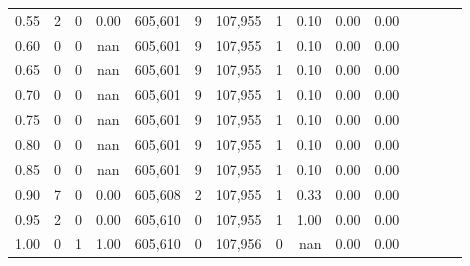 \begin{tabular}{rrrcrrrrrrrrrrr}
0.55 &        2 &       0 &                                       0.00 &  605,601 &        9 &  107,955 &        1 &  0.10 &  0.00 &                         0.00 \\
0.60 &        0 &       0 &                                        nan &  605,601 &        9 &  107,955 &        1 &  0.10 &  0.00 &                         0.00 \\
0.65 &        0 &       0 &                                        nan &  605,601 &        9 &  107,955 &        1 &  0.10 &  0.00 &                         0.00 \\
0.70 &        0 &       0 &                                        nan &  605,601 &        9 &  107,955 &        1 &  0.10 &  0.00 &                         0.00 \\
0.75 &        0 &       0 &                                        nan &  605,601 &        9 &  107,955 &        1 &  0.10 &  0.00 &                         0.00 \\
0.80 &        0 &       0 &                                        nan &  605,601 &        9 &  107,955 &        1 &  0.10 &  0.00 &                         0.00 \\
0.85 &        0 &       0 &                                        nan &  605,601 &        9 &  107,955 &        1 &  0.10 &  0.00 &                         0.00 \\
0.90 &        7 &       0 &                                       0.00 &  605,608 &        2 &  107,955 &        1 &  0.33 &  0.00 &                         0.00 \\
0.95 &        2 &       0 &                                       0.00 &  605,610 &        0 &  107,955 &        1 &  1.00 &  0.00 &                         0.00 \\
1.00 &        0 &       1 &                                       1.00 &  605,610 &        0 &  107,956 &        0 &   nan &  0.00 &                         0.00 \\
\bottomrule
\end{tabular}

